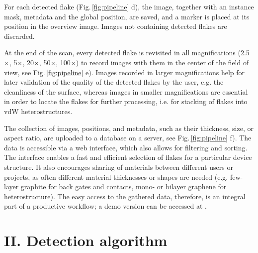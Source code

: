 \documentclass[reprint, prl, superscriptaddress, floatfix]{revtex4-2}
\newcommand{\fig}[1]{Fig.\,\ref{#1}}
\begin{document}
For each detected flake  (\fig{fig:pipeline} d), the image, together with an instance mask, metadata and the global position, are saved, and a marker is placed at its position in the overview image.
Images not containing detected flakes are discarded.

At the end of the scan, every detected flake is revisited in all magnifications (2.5$\times$, 5$\times$, 20$\times$, 50$\times$, 100$\times$) to record images with them in the center of the field of view, see \fig{fig:pipeline} e).
Images recorded in larger magnifications help for later validation of the quality of the detected flakes by the user, e.g. the cleanliness of the surface, whereas images in smaller magnifications are essential in order to locate the flakes for further processing, i.e. for stacking of flakes into vdW heterostructures.

The collection of images, positions, and metadata, such as their thickness, size, or aspect ratio, are uploaded to a database on a server, see \fig{fig:pipeline} f). 
The data is accessible via a web interface, which also allows for filtering and sorting.
The interface enables a fast and efficient selection of flakes for a particular device structure.
It also encourages sharing of materials between different users or projects, as often different material thicknesses or shapes are needed (e.g. few-layer graphite for back gates and contacts, mono- or bilayer graphene for heterostructure). 
The easy access to the gathered data, therefore, is an integral part of a productive workflow; a demo version can be accessed at \cite{website}.


\section{II. Detection algorithm}
\end{document}
